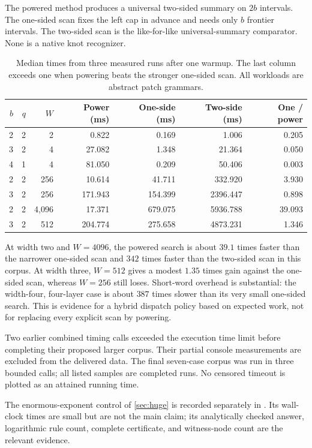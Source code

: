 \documentclass[11pt,a4paper]{article}
\theoremstyle{definition}
\newcommand{\code}[1]{\texttt{\detokenize{#1}}}
\begin{document}
The powered method produces a universal two-sided summary on $2b$ intervals. The one-sided scan fixes the left cap in advance and needs only $b$ frontier intervals. The two-sided scan is the like-for-like universal-summary comparator. None is a native knot recognizer.

\begin{table}[ht]
\centering
\small
\begin{tabular}{rrrrrrr}
\toprule
$b$ & $q$ & $W$ & Power (ms) & One-side (ms) & Two-side (ms) & One / power\\
\midrule
2 & 2 & 2 & 0.822 & 0.169 & 1.006 & 0.205 \\
3 & 2 & 4 & 27.082 & 1.348 & 21.364 & 0.050 \\
4 & 1 & 4 & 81.050 & 0.209 & 50.406 & 0.003 \\
2 & 2 & 256 & 10.614 & 41.711 & 332.920 & 3.930 \\
3 & 2 & 256 & 171.943 & 154.399 & 2396.447 & 0.898 \\
2 & 2 & 4,096 & 17.371 & 679.075 & 5936.788 & 39.093 \\
3 & 2 & 512 & 204.774 & 275.658 & 4873.231 & 1.346 \\
\bottomrule
\end{tabular}
\caption{Median times from three measured runs after one warmup. The last column exceeds one when powering beats the stronger one-sided scan. All workloads are abstract patch grammars.}
\label{tab:bench}
\end{table}

At width two and $W=4096$, the powered search is about $39.1$ times faster than the narrower one-sided scan and $342$ times faster than the two-sided scan in this corpus. At width three, $W=512$ gives a modest $1.35$ times gain against the one-sided scan, whereas $W=256$ still loses. Short-word overhead is substantial: the width-four, four-layer case is about $387$ times slower than its very small one-sided search. This is evidence for a hybrid dispatch policy based on expected work, not for replacing every explicit scan by powering.

Two earlier combined timing calls exceeded the execution time limit before completing their proposed larger corpus. Their partial console measurements are excluded from the delivered data. The final seven-case corpus was run in three bounded calls; all listed samples are completed runs. No censored timeout is plotted as an attained running time.

The enormous-exponent control of \cref{sec:huge} is recorded separately in \code{data/audit.json}. Its wall-clock times are small but are not the main claim; its analytically checked answer, logarithmic rule count, complete certificate, and witness-node count are the relevant evidence.
\end{document}
